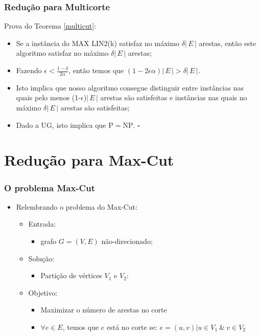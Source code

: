 \documentclass[11pt, handout]{beamer}
\newcommand{\pp}{\ensuremath{\mathrm{P}}\xspace}
\newcommand{\np}{\ensuremath{\mathrm{NP}}\xspace}
\begin{document}
\begin{frame}[<+->]
    \frametitle{Redução para Multicorte}
    Prova do Teorema \ref{multicut}:
    \begin{itemize}
        \item Se a instância do MAX LIN2(k) satisfaz no máximo $\delta|\,E\,|$ arestas, então este algoritmo satisfaz no máximo $\delta|\,E\,|$ arestas;
        \item Fazendo $\epsilon < \frac{1-\delta}{2\alpha}$, então temos que $(1-2\epsilon\alpha)|\,E\,| > \delta|\,E\,|$.
        \item Isto implica que nosso algoritmo consegue distinguir entre instâncias nas quais pelo menos (1-$\epsilon$)$|\,E\,|$ arestas são satisfeitas e instâncias nas quais no máximo $\delta|\,E\,|$ arestas são satisfeitas;
        \item Dado a UG, isto implica que $\pp = \np$. $\square$
    \end{itemize}
\end{frame}{}




\section{Redução para Max-Cut}

\begin{frame}[<+->]
    \frametitle{O problema Max-Cut}
        \begin{itemize}
            \item Relembrando o problema do Max-Cut:
                \begin{itemize}
                    \item Entrada:
                        \begin{itemize}
                            \item grafo $G=(V,E)$ não-direcionado;
                        \end{itemize}
                    \item Solução:
                        \begin{itemize}
                            \item Partição de vértices $V_1$ e $V_2$:
                        \end{itemize}
                    \item Objetivo:
                        \begin{itemize}
                            \item Maximizar o número de arestas no corte
                            \item $\forall e\in E$, temos que $e $ está no corte se: $e=(u,v)|u\in V_1 \ \& \ v\in V_2 $
                        \end{itemize} 
                \end{itemize}
        \end{itemize}        
\end{frame}{}
\end{document}
